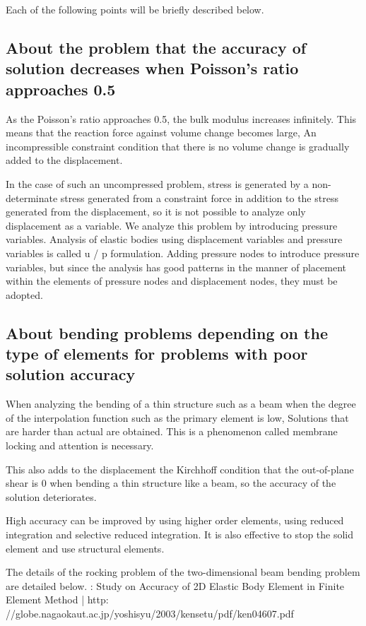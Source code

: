 Each of the following points will be briefly described below.

\subsection{About the problem that the accuracy of solution decreases when Poisson's ratio approaches 0.5}


As the Poisson's ratio approaches 0.5, the bulk modulus increases infinitely.
This means that the reaction force against volume change becomes large,
An incompressible constraint condition that there is no volume change is gradually added to the displacement.

In the case of such an uncompressed problem, stress is generated by a non-determinate stress generated from a constraint force in addition to the stress generated from the displacement, so it is not possible to analyze only displacement as a variable. We analyze this problem by introducing pressure variables. Analysis of elastic bodies using displacement variables and pressure variables is called u / p formulation. Adding pressure nodes to introduce pressure variables, but since the analysis has good patterns in the manner of placement within the elements of pressure nodes and displacement nodes, they must be adopted.


\subsection{About bending problems depending on the type of elements for problems with poor solution accuracy}


When analyzing the bending of a thin structure such as a beam when the degree of the interpolation function such as the primary element is low,
Solutions that are harder than actual are obtained.
This is a phenomenon called membrane locking and attention is necessary.

This also adds to the displacement the Kirchhoff condition that the out-of-plane shear is 0 when bending a thin structure like a beam, so the accuracy of the solution deteriorates.

High accuracy can be improved by using higher order elements, using reduced integration and selective reduced integration.
It is also effective to stop the solid element and use structural elements.

The details of the rocking problem of the two-dimensional beam bending problem are detailed below.
: Study on Accuracy of 2D Elastic Body Element in Finite Element Method | http: //globe.nagaokaut.ac.jp/yoshisyu/2003/kensetu/pdf/ken04607.pdf

